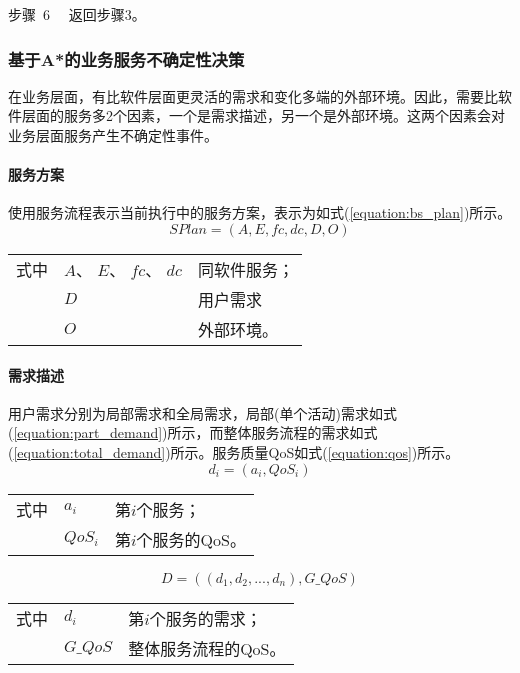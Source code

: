 步骤~6~~ 返回步骤3。

\subsubsection{基于A*的业务服务不确定性决策}
在业务层面，有比软件层面更灵活的需求和变化多端的外部环境。因此，需要比软件层面的服务多2个因素，一个是需求描述，另一个是外部环境。这两个因素会对业务层面服务产生不确定性事件。

\setcounter{paragraph}{0}
\paragraph{服务方案}
使用服务流程表示当前执行中的服务方案，表示为如式(\ref{equation:bs_plan})所示。
\begin{equation}\label{equation:bs_plan}
SPlan = \left( {A,E,fc,dc,D,O} \right)
\end{equation}
\begin{tabularx}{\textwidth}{@{}l@{\quad}l@{\pozhehao }X@{}}
    式中
    & ${A}$、 ${E}$、 ${fc}$、 ${dc}$ & 同软件服务；\\
    & ${D}$ & 用户需求 \\
    & ${O}$ & 外部环境。
\end{tabularx}\vspace{\wordsep}

\paragraph{需求描述}
用户需求分别为局部需求和全局需求，局部(单个活动)需求如式(\ref{equation:part_demand})所示，而整体服务流程的需求如式(\ref{equation:total_demand})所示。服务质量QoS如式(\ref{equation:qos})所示。
\begin{equation}\label{equation:part_demand}
d_i = \left(a_i, QoS_i \right)
\end{equation}
\begin{tabularx}{\textwidth}{@{}l@{\quad}l@{\pozhehao }X@{}}
    式中
    & ${a_i}$ & 第${i}$个服务； \\
    & ${QoS_i}$ & 第${i}$个服务的QoS。
\end{tabularx}\vspace{\wordsep}

\begin{equation}\label{equation:total_demand}
D = \left ((d_1, d_2, ..., d_n), G\_QoS \right)
\end{equation}
\begin{tabularx}{\textwidth}{@{}l@{\quad}l@{\pozhehao }X@{}}
    式中
    & ${d_i}$ & 第${i}$个服务的需求； \\
    & ${G\_QoS}$ & 整体服务流程的QoS。
\end{tabularx}\vspace{\wordsep}

